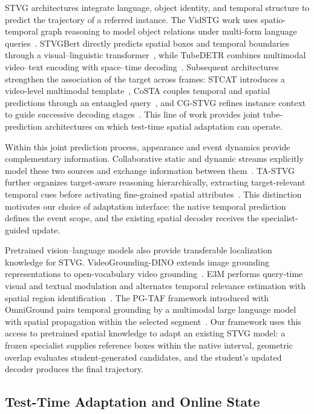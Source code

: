 \documentclass[10pt,twocolumn,letterpaper]{article}
\begin{document}
STVG architectures integrate language, object identity, and temporal structure
to predict the trajectory of a referred instance.
The VidSTG work uses spatio-temporal graph reasoning to model object relations
under multi-form language queries~\cite{vidstg}.
STVGBert directly predicts spatial boxes and temporal boundaries through a
visual--linguistic transformer~\cite{stvgb}, while TubeDETR combines multimodal
video--text encoding with space--time decoding~\cite{tubedetr}.
Subsequent architectures strengthen the association of the target across
frames: STCAT introduces a video-level multimodal template~\cite{stcat},
CoSTA couples temporal and spatial predictions through an entangled
query~\cite{costa}, and CG-STVG refines instance context to guide successive
decoding stages~\cite{cgstvg}.
This line of work provides joint tube-prediction architectures on which
test-time spatial adaptation can operate.

Within this joint prediction process, appearance and event dynamics provide
complementary information.
Collaborative static and dynamic streams explicitly model these two sources
and exchange information between them~\cite{dualstream}.
TA-STVG further organizes target-aware reasoning hierarchically, extracting
target-relevant temporal cues before activating fine-grained spatial
attributes~\cite{tastvg}.
This distinction motivates our choice of adaptation interface: the native
temporal prediction defines the event scope, and the existing spatial decoder
receives the specialist-guided update.

Pretrained vision--language models also provide transferable localization
knowledge for STVG.
VideoGrounding-DINO extends image grounding representations to open-vocabulary
video grounding~\cite{videodino}.
E3M performs query-time visual and textual modulation and alternates temporal
relevance estimation with spatial region identification~\cite{e3m}.
The PG-TAF framework introduced with OmniGround pairs temporal grounding by
a multimodal large language model with spatial propagation within the
selected segment~\cite{omniground}.
Our framework uses this access to pretrained spatial knowledge to adapt an
existing STVG model: a frozen specialist supplies reference boxes within the native
interval, geometric overlap evaluates student-generated candidates, and the student's updated decoder
produces the final trajectory.

\subsection{Test-Time Adaptation and Online State}
\end{document}
